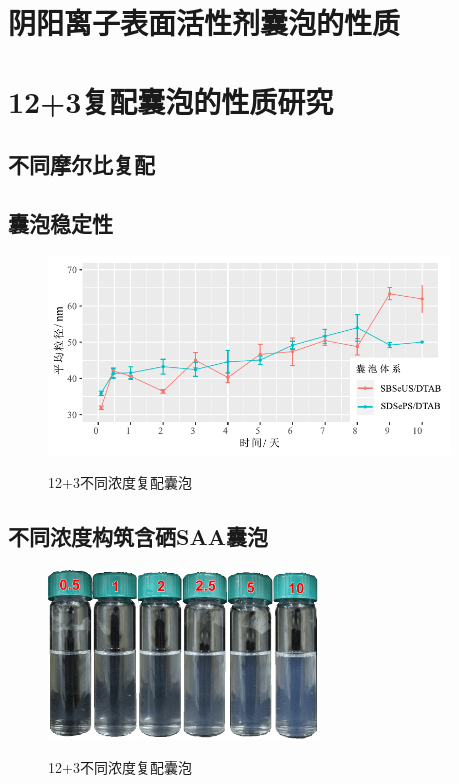 \documentclass[bachelor,fandolfonts,replaceperiod]{jnuthesis}
\begin{document}
    \section{阴阳离子表面活性剂囊泡的性质}
    \section{12+3复配囊泡的性质研究}
    \subsection{不同摩尔比复配}
    
    \subsection{囊泡稳定性}
    \begin{figure}[htbp]
        \centering
        \includegraphics[width=0.95\textwidth]{figure/time.pdf}\\
        \caption{12+3不同浓度复配囊泡}\label{fig:ve}
    \end{figure}
    \subsection{不同浓度构筑含硒SAA囊泡}

    \begin{figure}[htbp]
        \centering
        \includegraphics[height=4.5cm]{figure/123concentration.png}\\
        \caption{12+3不同浓度复配囊泡}\label{fig:vesicle-concentration}
    \end{figure}
\end{document}
